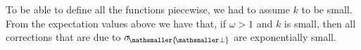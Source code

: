 \documentclass[11pt, a4paper]{article}
\newcommand{\om}{\omega}
\newcommand{\si}{{\sigma}}
\let\perptmp\perp
\renewcommand{\perp}{{\! \mathsmaller{\perptmp}}}
\begin{document}
To be able to define all the functions piecewise, we had to assume $k$ to be small. 
From the expectation values above we have that, if $\om>1$ and $k$ is small, then all corrections that are due to $\si_\perp$ are exponentially small.



\end{document}
